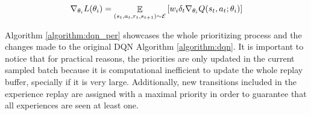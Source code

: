 \begin{equation}
    \nabla_{\theta_i} L(\theta_i) = \mathop{\mathbb{E}}\limits_{(s_t, a_t, r_t, s_{t+1}) \sim \mathcal{E}}\left[ w_i \delta_t \nabla_{\theta_i}Q(s_t, a_t; \theta_i)\right] 
\end{equation}

Algorithm \ref{algorithm:dqn_per} showcases the whole prioritizing process and the changes made to the original DQN Algorithm \ref{algorithm:dqn}. It is important to notice that for practical reasons, the priorities are only updated in the current sampled batch because it is computational inefficient to update the whole replay buffer, specially if it is very large. Additionally, new transitions included in the experience replay are assigned with a maximal priority in order to guarantee that all experiences are seen at least one.




